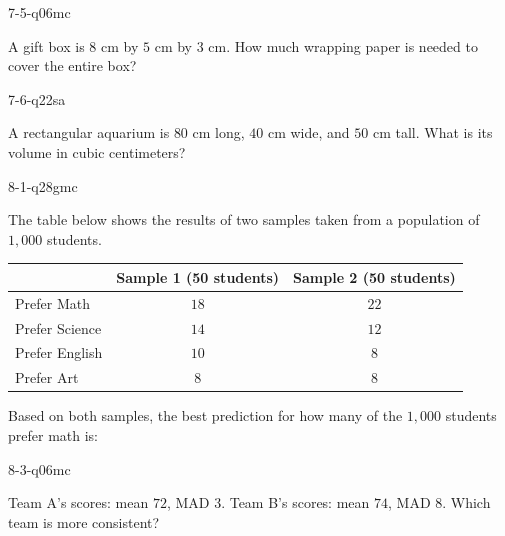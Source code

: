\begin{practiceQuestion}{7-5-q06}{mc}
\begin{questionText}
A gift box is $8$ cm by $5$ cm by $3$ cm. How much wrapping paper is needed to cover the entire box?
\end{questionText}
\end{practiceQuestion}

\begin{practiceQuestion}{7-6-q22}{sa}
\begin{questionText}
A rectangular aquarium is $80$ cm long, $40$ cm wide, and $50$ cm tall. What is its volume in cubic centimeters?
\end{questionText}
\end{practiceQuestion}

\begin{practiceQuestion}{8-1-q28}{gmc}
\begin{questionText}
The table below shows the results of two samples taken from a population of $1{,}000$ students.

\begin{center}
\begin{tabular}{|l|c|c|}
\hline
 & \textbf{Sample 1 (50 students)} & \textbf{Sample 2 (50 students)} \\
\hline
Prefer Math & $18$ & $22$ \\
\hline
Prefer Science & $14$ & $12$ \\
\hline
Prefer English & $10$ & $8$ \\
\hline
Prefer Art & $8$ & $8$ \\
\hline
\end{tabular}
\end{center}

Based on both samples, the best prediction for how many of the $1{,}000$ students prefer math is:
\end{questionText}
\end{practiceQuestion}

\begin{practiceQuestion}{8-3-q06}{mc}
\begin{questionText}
Team A's scores: mean $72$, MAD $3$. Team B's scores: mean $74$, MAD $8$. Which team is more consistent?
\end{questionText}
\end{practiceQuestion}

